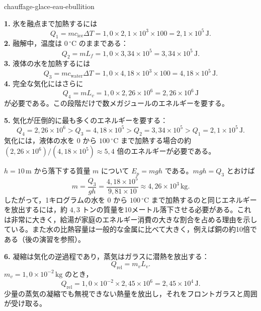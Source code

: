 \begin{exo}{chauffage-glace-eau-ebullition}
\begin{solution}
\textbf{1.} 氷を融点まで加熱するには
\[
Q_1=mc_{\text{ice}}\Delta T
=1{,}0\times2{,}1\times10^3\times100=2{,}1\times10^5\,\text{J}.
\]
\textbf{2.} 融解中，温度は $0\,{}^\circ\text{C}$ のままである：
\[
Q_2=mL_f=1{,}0\times3{,}34\times10^5=3{,}34\times10^5\,\text{J}.
\]
\textbf{3.} 液体の水を加熱するには
\[
Q_3=mc_{\text{water}}\Delta T
=1{,}0\times4{,}18\times10^3\times100=4{,}18\times10^5\,\text{J}.
\]
\textbf{4.} 完全な気化にはさらに
\[
Q_4=mL_v=1{,}0\times2{,}26\times10^6=2{,}26\times10^6\,\text{J}
\]
が必要である。この段階だけで数メガジュールのエネルギーを要する。

\textbf{5.} 気化が圧倒的に最も多くのエネルギーを要する：
\[
Q_4=2{,}26\times10^6>Q_3=4{,}18\times10^5>Q_2=3{,}34\times10^5>Q_1=2{,}1\times10^5\,\text{J}.
\]
気化には，液体の水を $0$ から $100\,{}^\circ\text{C}$ まで加熱する場合の約 $(2{,}26\times10^6)/(4{,}18\times10^5)\approx5{,}4$ 倍のエネルギーが必要である。

$h=10\,\text{m}$ から落下する質量 $m$ について $E_p=mgh$ である。$mgh=Q_3$ とおけば
\[
m=\frac{Q_3}{gh}=\frac{4{,}18\times10^5}{9{,}81\times10}
\approx4{,}26\times10^3\,\text{kg}.
\]
したがって，1キログラムの水を $0$ から $100\,{}^\circ\text{C}$ まで加熱するのと同じエネルギーを放出するには，約 $4{,}3$ トンの質量を10メートル落下させる必要がある。これは非常に大きく，給湯が家庭のエネルギー消費の大きな割合を占める理由を示している。また水の比熱容量は一般的な金属に比べて大きく，例えば銅の約10倍である（後の演習を参照）。

\textbf{6.} 凝縮は気化の逆過程であり，蒸気はガラスに潜熱を放出する：
\[
Q_{\text{rel}}=m_vL_v.
\]
$m_v=1{,}0\times10^{-2}\,\text{kg}$ のとき，
\[
Q_{\text{rel}}=1{,}0\times10^{-2}\times2{,}45\times10^6
=2{,}45\times10^4\,\text{J}.
\]
少量の蒸気の凝縮でも無視できない熱量を放出し，それをフロントガラスと周囲が受け取る。
\end{solution}
\end{exo}


